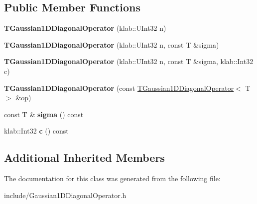 \subsection*{Public Member Functions}
\begin{DoxyCompactItemize}
\item 
{\bfseries T\+Gaussian1\+D\+Diagonal\+Operator} (klab\+::\+U\+Int32 n)\hypertarget{classkl1p_1_1TGaussian1DDiagonalOperator_a9662b11615037f761673a5b996a8d7f3}{}\label{classkl1p_1_1TGaussian1DDiagonalOperator_a9662b11615037f761673a5b996a8d7f3}

\item 
{\bfseries T\+Gaussian1\+D\+Diagonal\+Operator} (klab\+::\+U\+Int32 n, const T \&sigma)\hypertarget{classkl1p_1_1TGaussian1DDiagonalOperator_ac7320e45fa7f069475059800e7582387}{}\label{classkl1p_1_1TGaussian1DDiagonalOperator_ac7320e45fa7f069475059800e7582387}

\item 
{\bfseries T\+Gaussian1\+D\+Diagonal\+Operator} (klab\+::\+U\+Int32 n, const T \&sigma, klab\+::\+Int32 c)\hypertarget{classkl1p_1_1TGaussian1DDiagonalOperator_aa8db33138463100399a767cfce4cbe18}{}\label{classkl1p_1_1TGaussian1DDiagonalOperator_aa8db33138463100399a767cfce4cbe18}

\item 
{\bfseries T\+Gaussian1\+D\+Diagonal\+Operator} (const \hyperlink{classkl1p_1_1TGaussian1DDiagonalOperator}{T\+Gaussian1\+D\+Diagonal\+Operator}$<$ T $>$ \&op)\hypertarget{classkl1p_1_1TGaussian1DDiagonalOperator_a15d57ae2d1f326e3b5bde32fb5ee3377}{}\label{classkl1p_1_1TGaussian1DDiagonalOperator_a15d57ae2d1f326e3b5bde32fb5ee3377}

\item 
const T \& {\bfseries sigma} () const \hypertarget{classkl1p_1_1TGaussian1DDiagonalOperator_a0c773e8664dcb056abd4a5187458dd8c}{}\label{classkl1p_1_1TGaussian1DDiagonalOperator_a0c773e8664dcb056abd4a5187458dd8c}

\item 
klab\+::\+Int32 {\bfseries c} () const \hypertarget{classkl1p_1_1TGaussian1DDiagonalOperator_ad0532976037c07ae19f8e1821734b4f4}{}\label{classkl1p_1_1TGaussian1DDiagonalOperator_ad0532976037c07ae19f8e1821734b4f4}

\end{DoxyCompactItemize}
\subsection*{Additional Inherited Members}


The documentation for this class was generated from the following file\+:\begin{DoxyCompactItemize}
\item 
include/Gaussian1\+D\+Diagonal\+Operator.\+h\end{DoxyCompactItemize}
